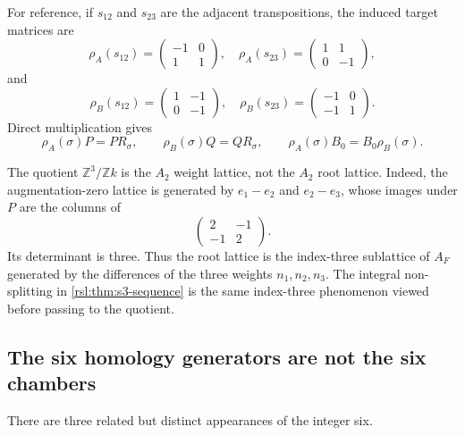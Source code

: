 For reference, if \(s_{12}\) and \(s_{23}\) are the adjacent
transpositions, the induced target matrices are
\begin{equation}
 \rho_A(s_{12})=\begin{pmatrix}-1&0\\1&1\end{pmatrix},
 \quad
 \rho_A(s_{23})=\begin{pmatrix}1&1\\0&-1\end{pmatrix},
 \label{rsl:eq:rho-A}
\end{equation}
and
\begin{equation}
 \rho_B(s_{12})=\begin{pmatrix}1&-1\\0&-1\end{pmatrix},
 \quad
 \rho_B(s_{23})=\begin{pmatrix}-1&0\\-1&1\end{pmatrix}.
 \label{rsl:eq:rho-B}
\end{equation}
Direct multiplication gives
\begin{equation}
 \rho_A(\sigma)P=PR_\sigma,
 \qquad
 \rho_B(\sigma)Q=QR_\sigma,
 \qquad
 \rho_A(\sigma)B_0=B_0\rho_B(\sigma).
 \label{rsl:eq:rho-intertwiners}
\end{equation}

The quotient \(\mathbb Z^3/\mathbb Zk\) is the \(A_2\) weight lattice, not
the \(A_2\) root lattice.  Indeed, the augmentation-zero lattice is generated
by \(e_1-e_2\) and \(e_2-e_3\), whose images under \(P\) are the columns of
\begin{equation}
 \begin{pmatrix}2&-1\\-1&2\end{pmatrix}.
 \label{rsl:eq:root-index}
\end{equation}
Its determinant is three.  Thus the root lattice is the index-three
sublattice of \(A_F\) generated by the differences of the three weights
\(n_1,n_2,n_3\).  The integral non-splitting in
\cref{rsl:thm:s3-sequence} is the same index-three phenomenon viewed before
passing to the quotient.

\subsection{The six homology generators are not the six chambers}
\label{rsl:subsec:three-sixes}

There are three related but distinct appearances of the integer six.

